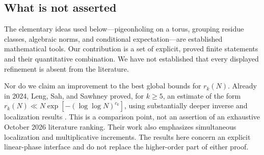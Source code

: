\documentclass[11pt,letterpaper]{article}
\numberwithin{equation}{section}
\theoremstyle{definition}
\theoremstyle{remark}
\newcommand{\1}{\mathbf 1}
\begin{document}
\subsection{What is not asserted}
The elementary ideas used below---pigeonholing on a torus, grouping residue classes, algebraic norms, and conditional expectation---are established mathematical tools. Our contribution is a set of explicit, proved finite statements and their quantitative combination. We have not established that every displayed refinement is absent from the literature.

Nor do we claim an improvement to the best global bounds for $r_k(N)$. Already in 2024, Leng, Sah, and Sawhney proved, for $k\geq5$, an estimate of the form $r_k(N)\ll N\exp[-(\log\log N)^{c_k}]$, using substantially deeper inverse and localization results \cite{lssbounds}. This is a comparison point, not an assertion of an exhaustive October 2026 literature ranking. Their work also emphasizes simultaneous localization and multiplicative increments. The results here concern an explicit linear-phase interface and do not replace the higher-order part of either proof.

\clearpage
\end{document}
